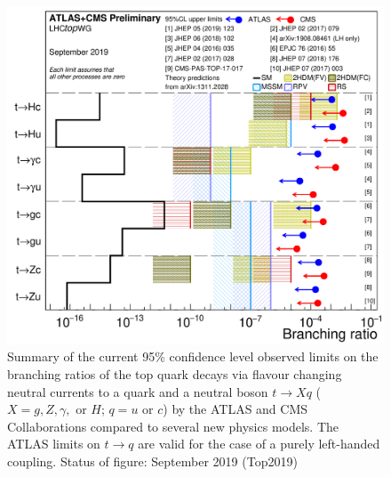 \begin{figure}[htb]
	\centering
	\includegraphics[scale=0.15]{Chapters/CH5/figures/fcnc_summarybsm}
	\caption{Summary of the current 95\% confidence level observed limits on the branching ratios of the top quark decays via flavour changing neutral currents to a quark and a neutral boson $t\rightarrow Xq$ ($X = g, Z, \gamma,$ or $H$; $q = u$ or $c$) by the ATLAS and CMS Collaborations compared to several new physics models. The ATLAS limits on $t \rightarrow q$ are valid for the case of a purely left-handed coupling. Status of figure: September 2019 (Top2019)}
	\label{fig:intro:limits}
\end{figure}

